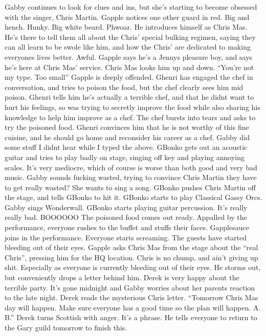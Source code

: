 Gabby continues to look for clues and ins, but she’s starting to become obsessed with the singer, Chris Martin.\medskip
Gapple notices one other guard in red. Big and hench. Hunky. Big white beard. Phwoar. He introduces himself as Chris Mas. He’s there to tell them all about the Chris’ special bulking regimen, saying they can all learn to be swole like him, and how the Chris’ are dedicated to making everyones lives better. Awful.\medskip
Gapple says he’s a Jennys pleasure boy, and says he’s here at Chris Mas’ service. Chris Mas looks him up and down. “You’re not my type. Too small” Gapple is deeply offended.\medskip
Ghenri has engaged the chef in conversation, and tries to poison the food, but the chef clearly sees him mid poison. Ghenri tells him he’s actually a terrible chef, and that he didnt want to hurt his feelings, so was trying to secretly improve the food while also sharing his knowledge to help him improve as a chef. The chef bursts into tears and asks to try the poisoned food. Ghenri convinces him that he is not worthy of this fine cuisine, and he should go home and reconsider his career as a chef.\medskip
Gabby did some stuff I didnt hear while I typed the above.\medskip
GBonko gets out an acoustic guitar and tries to play badly on stage, singing off key and playing annoying scales. It’s very mediocre, which of course is worse than both good and very bad music.\medskip
Gabby sounds fucking wasted, trying to convince Chris Martin they have to get really wasted? She wants to sing a song. GBonko pushes Chris Martin off the stage, and tells GBonko to hit it. GBonko starts to play Classical Gassy Orcs. Gabby sings Wonderwall. GBonko starts playing guitar percussion. It’s really really bad. BOOOOOO\medskip
The poisoned food comes out ready. Appalled by the performance, everyone rushes to the buffet and stuffs their faces.\medskip
Gapplesauce joins in the performance. Everyone starts screaming. The guests have started bleeding out of their eyes. Gapple asks Chris Mas from the stage about the “real Chris”, pressing him for the HQ location. Chris is no chump, and ain’t giving up shit. Especially as everyone is currently bleeding out of their eyes. He storms out, but conveniently drops a letter behind him.\medskip
Derek is very happy about the terrible party. It’s gone midnight and Gabby worries about her parents reaction to the late night. Derek reads the mysterious Chris letter.\medskip
“Tomorrow Chris Mas day will happen. Make sure everyone has a good time so the plan will happen. A. B.”\medskip
Derek turns Scottish with anger. It’s a phrase. He tells everyone to return to the Gary guild tomorrow to finish this.\medskip
